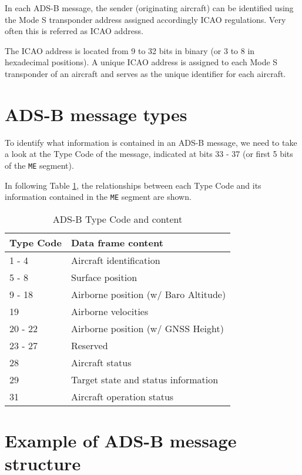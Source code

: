 In each ADS-B message, the sender (originating aircraft) can be identified using the Mode S transponder address assigned accordingly ICAO regulations. Very often this is referred as ICAO address. 

The ICAO address is located from 9 to 32 bits in binary (or 3 to 8 in hexadecimal positions). A unique ICAO address is assigned to each Mode S transponder of an aircraft and serves as the unique identifier for each aircraft.


\section{ADS-B message types}

To identify what information is contained in an ADS-B message, we need to take a look at the Type Code of the message, indicated at bits 33 - 37 (or first 5 bits of the \texttt{ME} segment).

In following Table \ref{tb:adsb-tc}, the relationships between each Type Code and its information contained in the \texttt{ME} segment are shown.

\begin{table}[ht]
\centering
\caption{ADS-B Type Code and content}
\label{tb:adsb-tc}
\begin{tabular}{|l|l|}
\hline
\textbf{Type Code} & \textbf{Data frame content} \\  \hline \hline
1 - 4     & Aircraft identification              \\  \hline
5 - 8     & Surface position                     \\  \hline
9 - 18    & Airborne position (w/ Baro Altitude) \\  \hline
19        & Airborne velocities                  \\  \hline
20 - 22   & Airborne position (w/ GNSS Height)   \\  \hline
23 - 27   & Reserved                             \\  \hline
28        & Aircraft status                      \\  \hline
29        & Target state and status information  \\  \hline
31        & Aircraft operation status            \\  \hline
\end{tabular}
\end{table}


\section{Example of ADS-B message structure}

